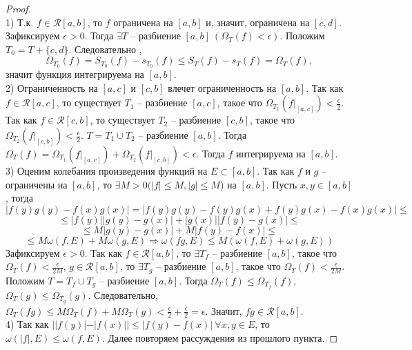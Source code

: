     \begin{proof} \ \\
        1) Т.к. $f \in \mathcal{R}[a, b]$, то $f$ ограничена на $[a, b]$ и, значит, ограничена на $[c, d]$.
        Зафиксируем $\epsilon > 0$. Тогда $\exists T$ -- разбиение $[a, b] \ (\Omega_{T}(f) < \epsilon)$.
        Положим $T_{0} = T + \{c, d\}$. Следовательно , 
        \[\Omega_{T_{0}}(f) = S_{T_{0}}(f) - s_{T_{0}}(f) \leq S_{T}(f) - s_{T}(f) = \Omega_{T}(f),\]
        значит функция интегрируема на $[a, b]$.
        \\2) Ограниченность на $[a, c]$ и $[c, b]$ влечет ограниченность на $[a, b]$.
        Так как $f \in \mathcal{R}[a, c]$, то существует $T_1$ -- разбиение $[a, c]$,
        такое что $\Omega_{T_1}(f|_{[a, c]}) < \frac{\epsilon}{2}$.
        Так как $f \in \mathcal{R}[c, b]$, то существует $T_2$ -- разбиение $[c, b]$,
        такое что $\Omega_{T_2}(f|_{[c, b]}) < \frac{\epsilon}{2}$.
        $T = T_1 \cup T_2$ -- разбиение $[a, b]$.
        Тогда $\Omega_{T}(f) = \Omega_{T_1}(f|_{[a, c]}) + \Omega_{T_2}(f|_{[c, b]}) < \epsilon$.
        Тогда $f$ интегрируема на $[a, b]$.
        \\3) Оценим колебания произведения функций на $E \subset [a, b]$.
        Так как $f$ и $g$ -- ограничены на $[a, b]$, то $\exists M > 0 (|f| \leq M, |g| \leq M$) на $[a, b]$.
        Пусть $x, y \in [a, b]$, тогда
        \[|f(y)g(y) - f(x)g(x)| = |f(y)g(y) - f(y)g(x) + f(y)g(x) - f(x)g(x)| \leq\]
        \[\leq |f(y)||g(y) - g(x)| + |g(x)||f(y) - g(x)| \leq\]
        \[\leq M|g(y) - g(x)| + M|f(y) - f(x)| \leq \]
        \[\leq M\omega(f, E) + M\omega(g, E) \Rightarrow \omega(fg, E) \leq M(\omega(f, E) + \omega(g, E))\]
        Зафиксируем $\epsilon > 0$. Так как $f \in \mathcal{R}[a, b]$, то $\exists T_f$ -- разбиение $[a, b]$,
        такое что $\Omega_T(f) < \frac{\epsilon}{2M}$, $g \in \mathcal{R}[a, b]$, то $\exists T_g$ -- разбиение $[a, b]$,
        такое что $\Omega_T(f) < \frac{\epsilon}{2M}$.
        Положим $T = T_f \cup T_g$ -- разбиение $[a, b]$. Тогда $\Omega_T(f) \leq \Omega_{T_f}(f)$,
        $\Omega_T(g) \leq \Omega_{T_g}(g)$. Следовательно, $\Omega_T(fg) \leq M\Omega_T(f) + M\Omega_T(g) <
        \frac{\epsilon}{2} + \frac{\epsilon}{2} = \epsilon$.
        Значит, $fg \in \mathcal{R}[a, b]$.
        \\4) Так как $||f(y)| - |f(x)|| \leq |f(y) - f(x)| \ \forall x, y \in E$,
        то $\omega(|f|, E) \leq \omega(f, E)$. Далее повторяем рассуждения из прошлого пункта.
    \end{proof}

